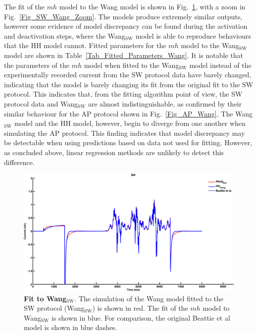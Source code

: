 \documentclass[11pt,a4paper,oneside]{article}
\begin{document}
The fit of the $mh$ model to the Wang model is shown in  Fig.~\ref{Fig_SW_Wang}, with a zoom in Fig.~\ref{Fig_SW_Wang_Zoom}. The models produce extremely similar outputs, however some evidence of model discrepancy can be found during the activation and deactivation steps, where the Wang$_\text{SW}$ model is able to reproduce behaviours that the HH model cannot. Fitted parameters for the $mh$ model to the Wang$_\text{SW}$ model are shown in Table~\ref{Tab_Fitted_Parameters_Wang}. It is notable that the parameters of the $mh$ model when fitted to the Wang$_\text{SW}$ model instead of the experimentally recorded current from the SW protocol data have barely changed, indicating that the model is barely changing its fit from the original fit to the SW protocol. This indicates that, from the fitting algorithm point of view, the SW protocol data and Wang$_\text{SW}$ are almost indistinguishable, as confirmed by their similar behaviour for the AP protocol shown in Fig.~\ref{Fig_AP_Wang}. The Wang$_\text{SW}$ model and the HH model, however, begin to diverge from one another when simulating the AP protocol. This finding indicates that model discrepancy may be detectable when using predictions based on data not used for fitting. However, as concluded above, linear regression methods are unlikely to detect this difference. 

\begin{figure}[ht]
\begin{center}
\includegraphics[scale=0.42]{Figures/Fig_mh_16713110_FP_sine_wave_wang_CP_sine_wave_wang.png}
\caption{\textbf{Fit to Wang$_\text{SW}$}. The simulation of the Wang model fitted to the SW protocol (Wang$_\text{SW}$) is shown in red. The fit of the $mh$ model to Wang$_\text{SW}$ is shown in blue. For comparison, the original Beattie et al model is shown in blue dashes.} 
\label{Fig_SW_Wang}
\end{center}
\end{figure}
\end{document}
